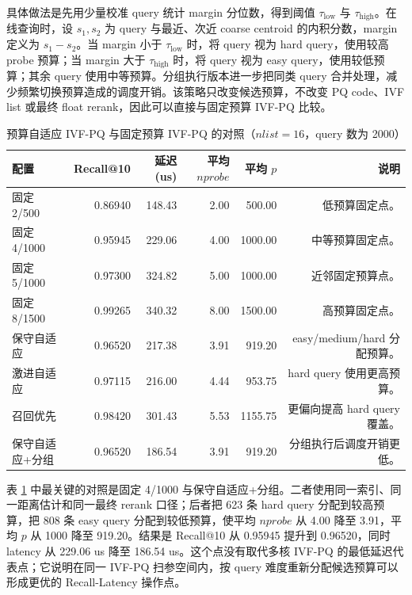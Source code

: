\documentclass[a4paper,11pt,UTF8]{ctexart}
\begin{document}
具体做法是先用少量校准 query 统计 margin 分位数，得到阈值 $\tau_{\mathrm{low}}$ 与 $\tau_{\mathrm{high}}$。在线查询时，设 $s_1,s_2$ 为 query 与最近、次近 coarse centroid 的内积分数，margin 定义为 $s_1-s_2$。当 margin 小于 $\tau_{\mathrm{low}}$ 时，将 query 视为 hard query，使用较高 probe 预算；当 margin 大于 $\tau_{\mathrm{high}}$ 时，将 query 视为 easy query，使用较低预算；其余 query 使用中等预算。分组执行版本进一步把同类 query 合并处理，减少频繁切换预算造成的调度开销。该策略只改变候选预算，不改变 PQ code、IVF list 或最终 float rerank，因此可以直接与固定预算 IVF-PQ 比较。

\begin{table}[H]
  \centering\footnotesize
  \begin{tabular}{lrrrrr}
    \toprule
    配置 & Recall@10 & 延迟(us) & 平均 $nprobe$ & 平均 $p$ & 说明 \\
    \midrule
    固定 2/500 & 0.86940 & 148.43 & 2.00 & 500.00 & 低预算固定点。 \\
    固定 4/1000 & 0.95945 & 229.06 & 4.00 & 1000.00 & 中等预算固定点。 \\
    固定 5/1000 & 0.97300 & 324.82 & 5.00 & 1000.00 & 近邻固定预算点。 \\
    固定 8/1500 & 0.99265 & 340.32 & 8.00 & 1500.00 & 高预算固定点。 \\
    保守自适应 & 0.96520 & 217.38 & 3.91 & 919.20 & easy/medium/hard 分配预算。 \\
    激进自适应 & 0.97115 & 216.00 & 4.44 & 953.75 & hard query 使用更高预算。 \\
    召回优先 & 0.98420 & 301.43 & 5.53 & 1155.75 & 更偏向提高 hard query 覆盖。 \\
    保守自适应+分组 & 0.96520 & 186.54 & 3.91 & 919.20 & 分组执行后调度开销更低。 \\
    \bottomrule
  \end{tabular}
  \caption{预算自适应 IVF-PQ 与固定预算 IVF-PQ 的对照（$nlist=16$，query 数为 2000）}
  \label{tab:adaptive-ivfpq}
\end{table}

表 \ref{tab:adaptive-ivfpq} 中最关键的对照是固定 4/1000 与保守自适应+分组。二者使用同一索引、同一距离估计和同一最终 rerank 口径；后者把 623 条 hard query 分配到较高预算，把 808 条 easy query 分配到较低预算，使平均 $nprobe$ 从 4.00 降至 3.91，平均 $p$ 从 1000 降至 919.20。结果是 Recall@10 从 0.95945 提升到 0.96520，同时 latency 从 229.06 us 降至 186.54 us。这个点没有取代多核 IVF-PQ 的最低延迟代表点；它说明在同一 IVF-PQ 扫参空间内，按 query 难度重新分配候选预算可以形成更优的 Recall-Latency 操作点。
\end{document}
